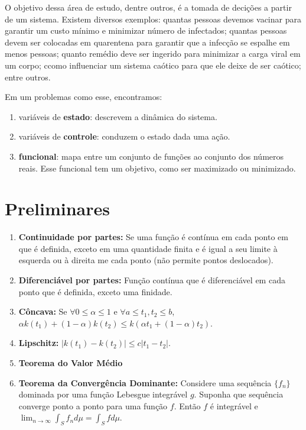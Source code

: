 O objetivo dessa área de estudo, dentre outros, é a tomada de decições a
partir de um sistema. Existem diversos exemplos: quantas pessoas devemos
vacinar para garantir um custo mínimo e minimizar número de infectados;
quantas pessoas devem ser colocadas em quarentena para garantir que a infecção
se espalhe em menos pessoas; quanto remédio deve ser ingerido para minimizar a
carga viral em um corpo; ccomo influenciar um sistema caótico para que ele
deixe de ser caótico; entre outros. 

Em um problemas como esse, encontramos: 
\begin{enumerate}
    \item variáveis de \textbf{estado}: descrevem a dinâmica do sistema. 
    \item variáveis de \textbf{controle}: conduzem o estado dada uma ação. 
    \item \textbf{funcional}: mapa entre um conjunto de funções ao
    conjunto dos números reais. Esse funcional tem um objetivo, como ser
    maximizado ou minimizado.  
\end{enumerate}

\section{Preliminares}
\begin{enumerate}
    \item \textbf{Continuidade por partes:} Se uma função é contínua em cada ponto em que é definida, exceto em uma quantidade finita e é igual a seu limite à esquerda ou à direita me cada ponto (não permite pontos deslocados). 
    \item \textbf{Diferenciável por partes:} Função contínua que é diferenciável em cada ponto que é definida, exceto uma finidade.
    \item \textbf{Côncava: } Se $\forall 0 \leq \alpha \leq 1$ e $\forall a \leq t_1,t_2 \leq b$, $\alpha k(t_1) + (1 - \alpha)k(t_2) \leq k(\alpha t_1 + (1 - \alpha)t_2)$.
    \item \textbf{Lipschitz: } $|k(t_1) - k(t_2)| \leq c|t_1 - t_2|$.
    \item \textbf{Teorema do Valor Médio}
    \item \textbf{Teorema da Convergência Dominante: } Considere uma sequência $\{f_n\}$ dominada por uma função Lebesgue integrável $g$. Suponha que sequência converge ponto a ponto para uma função $f$. Então $f$ é integrável e $\lim_{n \to \infty} \int_S f_n d\mu = \int_S f d\mu$.
\end{enumerate}

